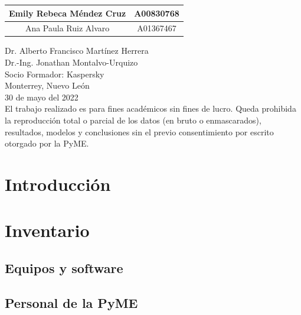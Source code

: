 \documentclass[10pt]{article}
\begin{document}
\begin{titlepage}
\begin{center}
\begin{table}[h!]
\begin{tabular}{ ||c|c|| }
                    \hline
                    Emily Rebeca Méndez Cruz & A00830768 \\
                    \hline
                    Ana Paula Ruiz Alvaro & A01367467 \\
                    \hline
                \end{tabular}
            \end{table}
            \vspace{0.7cm}
            \large Dr. Alberto Francisco Martínez Herrera \\ %
            \vspace{0.2cm}
            \large Dr.-Ing. Jonathan Montalvo-Urquizo \\ %
            \vspace{0.2cm}
            \large Socio Formador: Kaspersky \\
            \vspace{0.2cm}
            \large Monterrey, Nuevo León \\
            \vspace{0.2cm}
            \large 30 de mayo del 2022 \\
            \vspace{1cm}
            \footnotesize El trabajo realizado es para fines académicos sin fines de lucro. Queda prohibida la reproducción total o parcial de los datos (en bruto o enmascarados), resultados, modelos y conclusiones sin el previo consentimiento por escrito otorgado por la PyME. \\
        \end{center}
    \end{titlepage}
    
    \tableofcontents
    \clearpage

    \section{Introducción}

    \section{Inventario}

        \subsection{Equipos y software}

        \subsection{Personal de la PyME}
\end{document}
